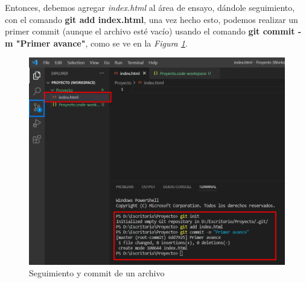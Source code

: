 Entonces, debemos agregar \textit{index.html} al área de ensayo, dándole seguimiento, con el comando \textbf{git add index.html}, una vez hecho esto, podemos realizar un primer commit (aunque el archivo esté vacío) usando el comando \textbf{git commit -m "Primer avance"}, como se ve en la \textit{Figura \ref{fig: 13}}.
\begin{figure}[H]
    \centering
    \caption{Seguimiento y commit de un archivo}
    \label{fig: 13}
    \includegraphics[width=12cm]{capturas/git add git commit.png}
\end{figure}

